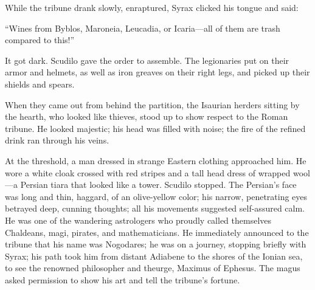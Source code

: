 While the tribune drank slowly, enraptured, Syrax clicked his tongue and said:

``Wines from Byblos, Maroneia, Leucadia, or Icaria---all of them are trash compared to this!'' %

It got dark. Scudilo gave the order to assemble. The legionaries put on their armor and helmets, as well as iron greaves on their right legs, and picked up their shields and spears.

When they came out from behind the partition, the Isaurian herders sitting by the hearth, who looked like thieves, stood up to show respect to the Roman tribune. He looked majestic; his head was filled with noise; the fire of the refined drink ran through his veins.

At the threshold, a man dressed in strange Eastern clothing approached him. He wore a white cloak crossed with red stripes and a tall head dress of wrapped wool---a Persian tiara that looked like a tower. Scudilo stopped. The Persian's face was long and thin, haggard, of an olive-yellow color; his narrow, penetrating eyes betrayed deep, cunning thoughts; all his movements suggested self-assured calm. He was one of the wandering astrologers who proudly called themselves Chaldeans, magi, pirates, and mathematicians. He immediately announced to the tribune that his name was Nogodares; he was on a journey, stopping briefly with Syrax; his path took him from distant Adiabene to the shores of the Ionian sea, to see the renowned philosopher and theurge, Maximus of Ephesus. The magus asked permission to show his art and tell the tribune's fortune.

